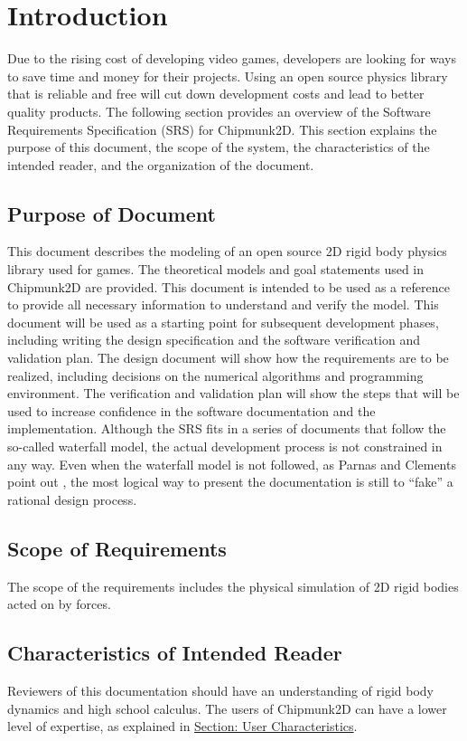 \documentclass[12pt]{article}
\begin{document}
\section{Introduction}
\label{Sec:Intro}
Due to the rising cost of developing video games, developers are looking for ways to save time and money for their projects. Using an open source physics library that is reliable and free will cut down development costs and lead to better quality products.
The following section provides an overview of the Software Requirements Specification (SRS) for Chipmunk2D. This section explains the purpose of this document, the scope of the system, the characteristics of the intended reader, and the organization of the document.
\subsection{Purpose of Document}
\label{Sec:DocPurpose}
This document describes the modeling of an open source 2D rigid body physics library used for games. The theoretical models and goal statements used in Chipmunk2D are provided. This document is intended to be used as a reference to provide all necessary information to understand and verify the model.
This document will be used as a starting point for subsequent development phases, including writing the design specification and the software verification and validation plan. The design document will show how the requirements are to be realized, including decisions on the numerical algorithms and programming environment. The verification and validation plan will show the steps that will be used to increase confidence in the software documentation and the implementation. Although the SRS fits in a series of documents that follow the so-called waterfall model, the actual development process is not constrained in any way. Even when the waterfall model is not followed, as Parnas and Clements point out \cite{parnasClements1986}, the most logical way to present the documentation is still to ``fake'' a rational design process.
\subsection{Scope of Requirements}
\label{Sec:ReqsScope}
The scope of the requirements includes the physical simulation of 2D rigid bodies acted on by forces.
\subsection{Characteristics of Intended Reader}
\label{Sec:ReaderChars}
Reviewers of this documentation should have an understanding of rigid body dynamics and high school calculus. The users of Chipmunk2D can have a lower level of expertise, as explained in \hyperref[Sec:UserChars]{Section: User Characteristics}.
\end{document}
